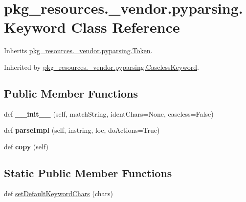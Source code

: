\hypertarget{classpkg__resources_1_1__vendor_1_1pyparsing_1_1_keyword}{}\section{pkg\+\_\+resources.\+\_\+vendor.\+pyparsing.\+Keyword Class Reference}
\label{classpkg__resources_1_1__vendor_1_1pyparsing_1_1_keyword}


Inherits \hyperlink{classpkg__resources_1_1__vendor_1_1pyparsing_1_1_token}{pkg\+\_\+resources.\+\_\+vendor.\+pyparsing.\+Token}.



Inherited by \hyperlink{classpkg__resources_1_1__vendor_1_1pyparsing_1_1_caseless_keyword}{pkg\+\_\+resources.\+\_\+vendor.\+pyparsing.\+Caseless\+Keyword}.

\subsection*{Public Member Functions}
\begin{DoxyCompactItemize}
\item 
\mbox{\label{classpkg__resources_1_1__vendor_1_1pyparsing_1_1_keyword_a8c3805a8d601ab8e92e2a968354b6623}} 
def {\bfseries \+\_\+\+\_\+init\+\_\+\+\_\+} (self, match\+String, ident\+Chars=None, caseless=False)
\item 
\mbox{\label{classpkg__resources_1_1__vendor_1_1pyparsing_1_1_keyword_aa922abca8f0fe86fcf6698180a7ad382}} 
def {\bfseries parse\+Impl} (self, instring, loc, do\+Actions=True)
\item 
\mbox{\label{classpkg__resources_1_1__vendor_1_1pyparsing_1_1_keyword_a52488aef63a7f6685d6f7f647c571fec}} 
def {\bfseries copy} (self)
\end{DoxyCompactItemize}
\subsection*{Static Public Member Functions}
\begin{DoxyCompactItemize}
\item 
def \hyperlink{classpkg__resources_1_1__vendor_1_1pyparsing_1_1_keyword_aa953b4f1c49d897e4e410e04c0f2a887}{set\+Default\+Keyword\+Chars} (chars)
\end{DoxyCompactItemize}
